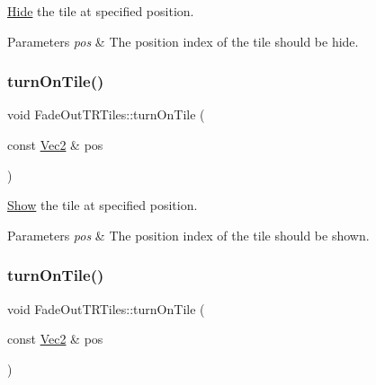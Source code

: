 \hyperlink{classHide}{Hide} the tile at specified position. 


\begin{DoxyParams}{Parameters}
{\em pos} & The position index of the tile should be hide. \\
\hline
\end{DoxyParams}
\mbox{\label{classFadeOutTRTiles_a9054a06a45fd2f88a3bab16643258123}} 
\subsubsection{\texorpdfstring{turn\+On\+Tile()}{turnOnTile()}\hspace{0.1cm}{\footnotesize\ttfamily [1/2]}}
{\footnotesize\ttfamily void Fade\+Out\+T\+R\+Tiles\+::turn\+On\+Tile (\begin{DoxyParamCaption}\item[{const \hyperlink{classVec2}{Vec2} \&}]{pos }\end{DoxyParamCaption})}



\hyperlink{classShow}{Show} the tile at specified position. 


\begin{DoxyParams}{Parameters}
{\em pos} & The position index of the tile should be shown. \\
\hline
\end{DoxyParams}
\mbox{\label{classFadeOutTRTiles_a9054a06a45fd2f88a3bab16643258123}} 
\subsubsection{\texorpdfstring{turn\+On\+Tile()}{turnOnTile()}\hspace{0.1cm}{\footnotesize\ttfamily [2/2]}}
{\footnotesize\ttfamily void Fade\+Out\+T\+R\+Tiles\+::turn\+On\+Tile (\begin{DoxyParamCaption}\item[{const \hyperlink{classVec2}{Vec2} \&}]{pos }\end{DoxyParamCaption})}



